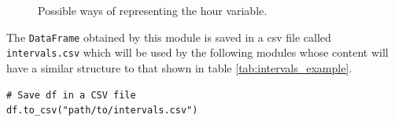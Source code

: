\begin{enumerate}
  \begin{figure}[H]
  \centering
  \hfill
  \caption{Possible ways of representing the hour variable.}
  \label{fig:hour-stepvssignal}
\end{figure}
    
\end{enumerate}

The \small{\verb|DataFrame|} \normalsize  obtained by this module is saved in a \acrshort{csv} file called \small{\verb|intervals.csv|} \normalsize  which will be used by the following modules whose content will have a similar structure to that shown in table \ref{tab:intervals_example}.

\begin{verbatim}
# Save df in a CSV file
df.to_csv("path/to/intervals.csv")
\end{verbatim}